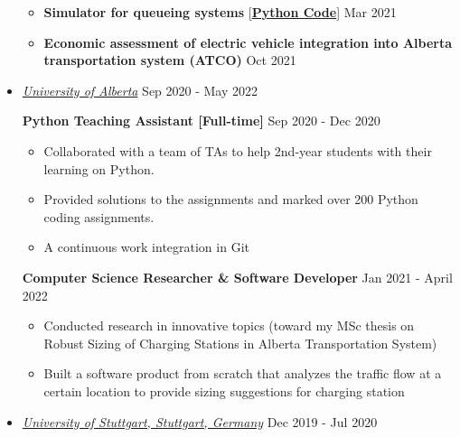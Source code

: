 \documentclass[10pt,letterpaper,sans]{moderncv} %
\begin{document}
\begin{itemize}
\begin{itemize}
		\item\textbf{Simulator for queueing systems} [\href{https://github.com/Hadi2525/queueing_theory}{\textbf{Python Code}}] \hfill Mar 2021
	 	\item \textbf{Economic assessment of electric vehicle integration into Alberta transportation system (ATCO)} \hfill Oct 2021
	\end{itemize}

\vspace{0.5cm}
	\item \href{http://ualberta.ca/}{ \emph{\large University of Alberta}} \hfill Sep 2020 - May 2022
	
	
	
	\textbf{Python Teaching Assistant [Full-time]} \hfill Sep 2020 - Dec 2020
	\begin{itemize}
		\item Collaborated with a team of TAs to help 2nd-year students with their learning on Python.
		\item Provided solutions to the assignments and marked over 200 Python coding assignments.
		\item A continuous work integration in Git
	\end{itemize}

	\textbf{Computer Science Researcher \& Software Developer} \hfill Jan 2021 - April 2022
	\begin{itemize}
		\item Conducted research in innovative topics (toward my MSc thesis on Robust Sizing of Charging Stations in Alberta Transportation System)
		\item Built a software product from scratch that analyzes the traffic flow at a certain location to provide sizing suggestions for charging station
	\end{itemize}
\vspace{0.5cm}

	\item \href{https://www.iaas.uni-stuttgart.de/en}{ \emph{\large University of Stuttgart, Stuttgart, Germany}} \hfill Dec 2019 - Jul 2020
	\vspace{0.25cm}
	

\end{itemize}
\end{document}
